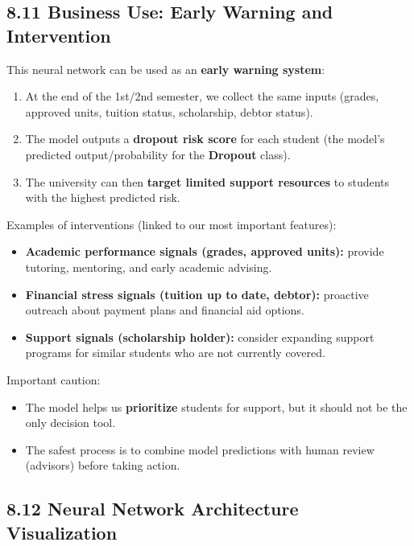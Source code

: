 \documentclass[
]{article}
\providecommand{\tightlist}{%
  \setlength{\itemsep}{0pt}\setlength{\parskip}{0pt}}
\begin{document}
\subsection{8.11 Business Use: Early Warning and
Intervention}\label{business-use-early-warning-and-intervention}

This neural network can be used as an \textbf{early warning system}:

\begin{enumerate}
\def\labelenumi{\arabic{enumi}.}
\tightlist
\item
  At the end of the 1st/2nd semester, we collect the same inputs
  (grades, approved units, tuition status, scholarship, debtor status).
\item
  The model outputs a \textbf{dropout risk score} for each student (the
  model's predicted output/probability for the \textbf{Dropout} class).
\item
  The university can then \textbf{target limited support resources} to
  students with the highest predicted risk.
\end{enumerate}

Examples of interventions (linked to our most important features):

\begin{itemize}
\tightlist
\item
  \textbf{Academic performance signals (grades, approved units):}
  provide tutoring, mentoring, and early academic advising.
\item
  \textbf{Financial stress signals (tuition up to date, debtor):}
  proactive outreach about payment plans and financial aid options.
\item
  \textbf{Support signals (scholarship holder):} consider expanding
  support programs for similar students who are not currently covered.
\end{itemize}

Important caution:

\begin{itemize}
\tightlist
\item
  The model helps us \textbf{prioritize} students for support, but it
  should not be the only decision tool.
\item
  The safest process is to combine model predictions with human review
  (advisors) before taking action.
\end{itemize}

\subsection{8.12 Neural Network Architecture
Visualization}\label{neural-network-architecture-visualization}
\end{document}
